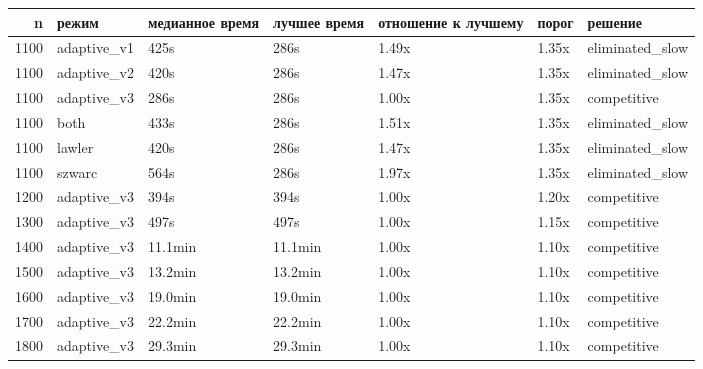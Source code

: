 \begin{tabular}{rllllll}
\toprule
n & режим & медианное время & лучшее время & отношение к лучшему & порог & решение \\
\midrule
1100 & adaptive\_v1 & 425s & 286s & 1.49x & 1.35x & eliminated\_slow \\
1100 & adaptive\_v2 & 420s & 286s & 1.47x & 1.35x & eliminated\_slow \\
1100 & adaptive\_v3 & 286s & 286s & 1.00x & 1.35x & competitive \\
1100 & both & 433s & 286s & 1.51x & 1.35x & eliminated\_slow \\
1100 & lawler & 420s & 286s & 1.47x & 1.35x & eliminated\_slow \\
1100 & szwarc & 564s & 286s & 1.97x & 1.35x & eliminated\_slow \\
1200 & adaptive\_v3 & 394s & 394s & 1.00x & 1.20x & competitive \\
1300 & adaptive\_v3 & 497s & 497s & 1.00x & 1.15x & competitive \\
1400 & adaptive\_v3 & 11.1min & 11.1min & 1.00x & 1.10x & competitive \\
1500 & adaptive\_v3 & 13.2min & 13.2min & 1.00x & 1.10x & competitive \\
1600 & adaptive\_v3 & 19.0min & 19.0min & 1.00x & 1.10x & competitive \\
1700 & adaptive\_v3 & 22.2min & 22.2min & 1.00x & 1.10x & competitive \\
1800 & adaptive\_v3 & 29.3min & 29.3min & 1.00x & 1.10x & competitive \\
\bottomrule
\end{tabular}
